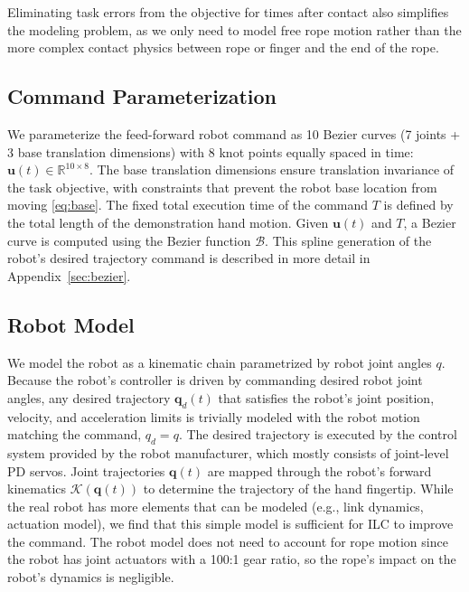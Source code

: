 \documentclass[conference]{IEEEtran}
\newcommand{\commandt}{\mathbf{u}(t)}
\begin{document}
Eliminating task errors from the objective for times after contact also simplifies the modeling problem, as we only need to model free rope motion rather than the more complex contact physics between rope or finger and the end of the rope.
 
\subsection{Command Parameterization}
We parameterize the feed-forward robot command as 10 Bezier curves (7 joints + 3 base translation dimensions) with 8 knot points equally spaced in time: $\commandt \in \mathbb{R}^{10 \times 8}$. 
The base translation dimensions ensure translation invariance of the task objective, with constraints that prevent the robot base location from moving \cref{eq:base}. 
The fixed total execution time of the command $T$ is defined by the total length of the demonstration hand motion. 
Given $\commandt$ and $T$, a Bezier curve is computed using the Bezier function $\mathcal{B}$. This spline generation of the robot's
desired trajectory command is described in more detail in Appendix~\cref{sec:bezier}.
\subsection{Robot Model}
We model the robot as a kinematic chain parametrized by robot joint angles $q$. Because the robot's controller is driven by commanding
desired robot joint angles, any desired trajectory $\mathbf{q}_d(t)$ that satisfies the robot's joint position, velocity, and acceleration limits is trivially modeled with the robot motion matching the command, $q_d=q$. 
The desired trajectory is executed by the control system provided by the robot manufacturer, which mostly consists of joint-level PD servos.
Joint trajectories $\mathbf{q}(t)$ are mapped through the robot's forward kinematics $\mathcal{K}(\mathbf{q}(t))$ to determine the trajectory of the hand fingertip. 
While the real robot has more elements that can be modeled (e.g., link dynamics, actuation model), we find that this simple model is sufficient for ILC to improve the command. The robot model does not need to account for rope motion since the robot has joint actuators with a 100:1 gear ratio, so the rope's impact on the robot's dynamics is negligible.

\end{document}
